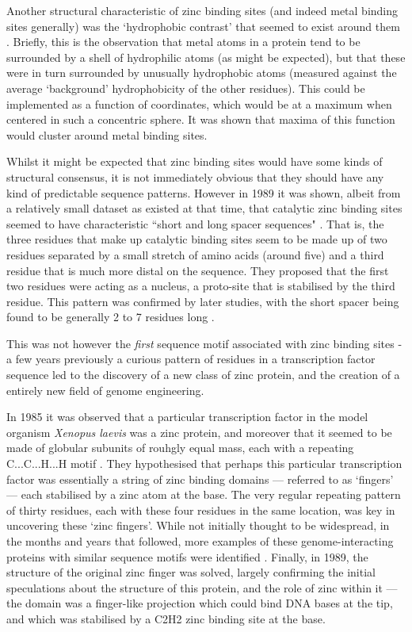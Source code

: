 Another structural characteristic of zinc binding sites (and indeed metal binding sites generally) was the `hydrophobic contrast' that seemed to exist around them \cite{yamashita1990metal,gregory1993prediction}. Briefly, this is the observation that metal atoms in a protein tend to be surrounded by a shell of hydrophilic atoms (as might be expected), but that these were in turn surrounded by unusually hydrophobic atoms (measured against the average `background' hydrophobicity of the other residues). This could be implemented as a function of coordinates, which would be at a maximum when centered in such a concentric sphere. It was shown that maxima of this function would cluster around metal binding sites.

Whilst it might be expected that zinc binding sites would have some kinds of structural consensus, it is not immediately obvious that they should have any kind of predictable sequence patterns. However in 1989 it was shown, albeit from a relatively small dataset as existed at that time, that catalytic zinc binding sites seemed to have characteristic ``short and long spacer sequences" \cite{vallee1989short}. That is, the three residues that make up catalytic binding sites seem to be made up of two residues separated by a small stretch of amino acids (around five) and a third residue that is much more distal on the sequence. They proposed that the first two residues were acting as a nucleus, a proto-site that is stabilised by the third residue. This pattern was confirmed by later studies, with the short spacer being found to be generally 2 to 7 residues long \cite{patel2007analysis}.

This was not however the \textit{first} sequence motif associated with zinc binding sites - a few years previously a curious pattern of residues in a transcription factor sequence led to the discovery of a new class of zinc protein, and the creation of a entirely new field of genome engineering.

In 1985 it was observed that a particular transcription factor in the model organism \emph{Xenopus laevis} was a zinc protein, and moreover that it seemed to be made of globular subunits of rouhgly equal mass, each with a repeating C...C...H...H motif \cite{miller1985repetitive}. They hypothesised that perhaps this particular transcription factor was essentially a string of zinc binding domains --- referred to as `fingers' --- each stabilised by a zinc atom at the base. The very regular repeating pattern of thirty residues, each with these four residues in the same location, was key in uncovering these `zinc fingers'. While not initially thought to be widespread, in the months and years that followed, more examples of these genome-interacting proteins with similar sequence motifs were identified \cite{payre1988finger}. Finally, in 1989, the structure of the original zinc finger was solved, largely confirming the initial speculations about the structure of this protein, and the role of zinc within it --- the domain was a finger-like projection which could bind DNA bases at the tip, and which was stabilised by a C2H2 zinc binding site at the base.

